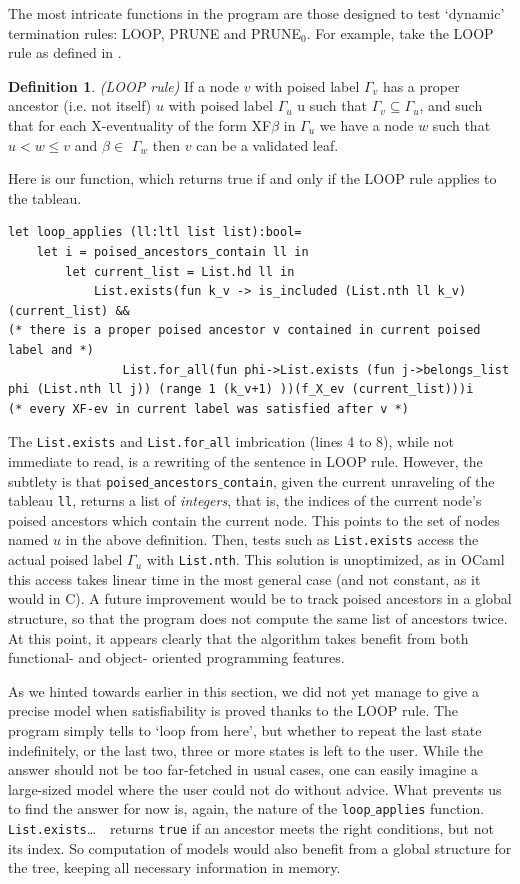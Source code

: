 \documentclass[11pt]{article}
\theoremstyle{definition}
\newtheorem*{definition}{Definition}
\begin{document}
The most intricate functions in the program are those designed to test `dynamic'
termination rules: LOOP, PRUNE and PRUNE$_0$. For example, take the LOOP rule as defined in 
\cite{ReyLTL}. 
\begin{definition}
    \emph{(LOOP rule)}
    If a node $v$ with poised label $\Gamma_v$ has a proper ancestor (i.e. not itself) $u$ with
poised label $\Gamma_u$ u such that $\Gamma_v \subseteq \Gamma_u$, and such that for each X-eventuality of the form XF$\beta$ in $\Gamma_u$ we
have a node $w$ such that $u < w \leq v $ and $\beta \in$ $\Gamma_w$ then $v$ can be a validated leaf.
\end{definition}
Here is our function, which returns true if and only if the LOOP rule
applies to the tableau.
\begin{lstlisting}
let loop_applies (ll:ltl list list):bool=
    let i = poised_ancestors_contain ll in
        let current_list = List.hd ll in
            List.exists(fun k_v -> is_included (List.nth ll k_v)(current_list) &&
(* there is a proper poised ancestor v contained in current poised label and *)
                List.for_all(fun phi->List.exists (fun j->belongs_list phi (List.nth ll j)) (range 1 (k_v+1) ))(f_X_ev (current_list)))i
(* every XF-ev in current label was satisfied after v *)
\end{lstlisting}

The {\tt List.exists} and {\tt List.for$\_$all} imbrication (lines 4 to 8), while not immediate to read, is a rewriting 
of the sentence in LOOP rule. However, the subtlety is that {\tt poised$\_$ancestors$\_$contain}, given the current unraveling
of the tableau {\tt ll}, returns a list of \emph{integers}, that is, the indices of the current node's poised ancestors
which contain the current node. This points to the set of nodes named $u$ in the above definition. Then, tests such as 
{\tt List.exists} access the actual poised label $\Gamma_u$ with {\tt List.nth}. This solution is unoptimized, as in OCaml 
this access takes linear time in the most general case (and not constant, as it would in C). 
A future improvement would be to track poised ancestors in a global structure,
so that the program does not compute the same list of ancestors twice. At this point, it appears clearly that 
the algorithm takes benefit from both functional- and object- oriented programming features. 

As we hinted towards earlier in this section, 
we did not yet manage to give a precise model when satisfiability is proved thanks to the LOOP rule. The program simply tells 
to `loop from here', but whether to repeat the last state indefinitely, or the last two, three or more
states is left to the user.
While the answer should not be too far-fetched in usual cases, one can easily imagine a large-sized model where 
the user could not do without advice. What prevents us to find the answer for now is, again, the nature 
of the {\tt loop$\_$applies} function. {\tt List.exists}\ldots $\mbox{ }$ returns {\tt true} if an ancestor meets the right conditions,
but not its index. So computation of models would also benefit from a global structure for the tree,
keeping all necessary information
in memory. 
\end{document}
